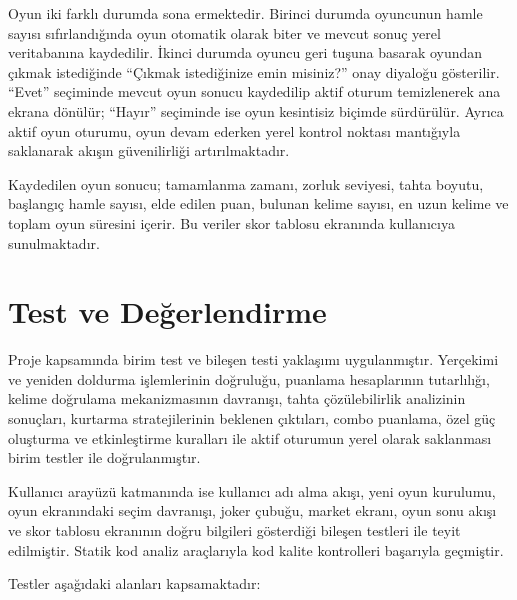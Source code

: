 \documentclass[conference]{IEEEtran}
\begin{document}
Oyun iki farklı durumda sona ermektedir. Birinci durumda oyuncunun hamle sayısı sıfırlandığında oyun otomatik olarak biter ve mevcut sonuç yerel veritabanına kaydedilir. İkinci durumda oyuncu geri tuşuna basarak oyundan çıkmak istediğinde ``Çıkmak istediğinize emin misiniz?'' onay diyaloğu gösterilir. ``Evet'' seçiminde mevcut oyun sonucu kaydedilip aktif oturum temizlenerek ana ekrana dönülür; ``Hayır'' seçiminde ise oyun kesintisiz biçimde sürdürülür. Ayrıca aktif oyun oturumu, oyun devam ederken yerel kontrol noktası mantığıyla saklanarak akışın güvenilirliği artırılmaktadır.

Kaydedilen oyun sonucu; tamamlanma zamanı, zorluk seviyesi, tahta boyutu, başlangıç hamle sayısı, elde edilen puan, bulunan kelime sayısı, en uzun kelime ve toplam oyun süresini içerir. Bu veriler skor tablosu ekranında kullanıcıya sunulmaktadır.

\section{Test ve Değerlendirme}

Proje kapsamında birim test ve bileşen testi yaklaşımı uygulanmıştır. Yerçekimi ve yeniden doldurma işlemlerinin doğruluğu, puanlama hesaplarının tutarlılığı, kelime doğrulama mekanizmasının davranışı, tahta çözülebilirlik analizinin sonuçları, kurtarma stratejilerinin beklenen çıktıları, combo puanlama, özel güç oluşturma ve etkinleştirme kuralları ile aktif oturumun yerel olarak saklanması birim testler ile doğrulanmıştır.

Kullanıcı arayüzü katmanında ise kullanıcı adı alma akışı, yeni oyun kurulumu, oyun ekranındaki seçim davranışı, joker çubuğu, market ekranı, oyun sonu akışı ve skor tablosu ekranının doğru bilgileri gösterdiği bileşen testleri ile teyit edilmiştir. Statik kod analiz araçlarıyla kod kalite kontrolleri başarıyla geçmiştir.

Testler aşağıdaki alanları kapsamaktadır:
\end{document}
